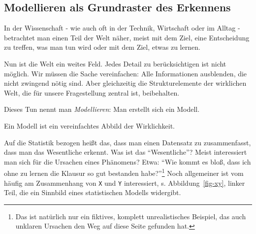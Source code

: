 \documentclass[
  a4paper,
  DIV=11]{scrreprt}
\theoremstyle{definition}
\theoremstyle{remark}
\begin{document}
\hypertarget{modellieren-als-grundraster-des-erkennens}{%
\subsection{Modellieren als Grundraster des
Erkennens}\label{modellieren-als-grundraster-des-erkennens}}

In der Wissenschaft - wie auch oft in der Technik, Wirtschaft oder im
Alltag - betrachtet man einen Teil der Welt näher, meist mit dem Ziel,
eine Entscheidung zu treffen, was man tun wird oder mit dem Ziel, etwas
zu lernen.

Nun ist die Welt ein weites Feld. Jedes Detail zu berücksichtigen ist
nicht möglich. Wir müssen die Sache vereinfachen: Alle Informationen
ausblenden, die nicht zwingend nötig sind. Aber gleichzeitig die
Strukturelemente der wirklichen Welt, die für unsere Fragestellung
zentral ist, beibehalten.

Dieses Tun nennt man \emph{Modellieren}: Man erstellt sich ein Modell.

\begin{tcolorbox}[enhanced jigsaw, colframe=quarto-callout-important-color-frame, title=\textcolor{quarto-callout-important-color}{\faExclamation}\hspace{0.5em}{Wichtig}, breakable, leftrule=.75mm, coltitle=black, toptitle=1mm, bottomrule=.15mm, bottomtitle=1mm, opacityback=0, arc=.35mm, rightrule=.15mm, left=2mm, colbacktitle=quarto-callout-important-color!10!white, opacitybacktitle=0.6, toprule=.15mm, titlerule=0mm, colback=white]
Ein Modell ist ein vereinfachtes Abbild der Wirklichkeit.
\end{tcolorbox}

Auf die Statistik bezogen heißt das, dass man einen Datensatz zu
zusammenfasst, dass man das Wesentliche erkennt. Was ist das
``Wesentliche''? Meist interessiert man sich für die Ursachen eines
Phänomens? Etwa: ``Wie kommt es bloß, dass ich ohne zu lernen die
Klausur so gut bestanden habe?''\footnote{Das ist natürlich nur ein
  fiktives, komplett unrealistisches Beispiel, das auch unklaren
  Ursachen den Weg auf diese Seite gefunden hat.} Noch allgemeiner ist
vom häufig am Zusammenhang von \texttt{X} und \texttt{Y} interessiert,
s. Abbildung~\ref{fig-xy}, linker Teil, die ein Sinnbild eines
statistischen Modells widergibt.
\end{document}
